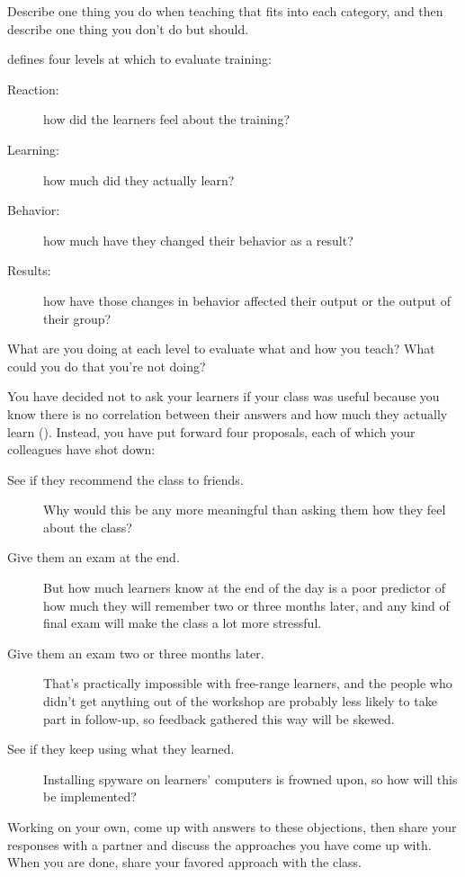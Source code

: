 Describe one thing you do when teaching that fits into each category,
and then describe one thing you don't do but should.


\cite{Kirk1994} defines four levels at which to evaluate training:

\begin{description}

\item[Reaction:]
  how did the learners feel about the training?

\item[Learning:]
  how much did they actually learn?

\item[Behavior:]
  how much have they changed their behavior as a result?

\item[Results:]
  how have those changes in behavior affected their output
  or the output of their group?

\end{description}

What are you doing at each level to evaluate what and how you teach?
What could you do that you're not doing?


You have decided not to ask your learners if your class was useful
because you know there is no correlation between their answers
and how much they actually learn ().
Instead,
you have put forward four proposals,
each of which your colleagues have shot down:

\begin{description}

\item[See if they recommend the class to friends.]
  Why would this be any more meaningful
  than asking them how they feel about the class?

\item[Give them an exam at the end.]
  But how much learners know at the end of the day
  is a poor predictor of how much they will remember two or three months later,
  and any kind of final exam will make the class a lot more stressful.

\item[Give them an exam two or three months later.]
  That's practically impossible with free-range learners,
  and the people who didn't get anything out of the workshop
  are probably less likely to take part in follow-up,
  so feedback gathered this way will be skewed.

\item[See if they keep using what they learned.]
  Installing spyware on learners' computers is frowned upon,
  so how will this be implemented?

\end{description}

Working on your own,
come up with answers to these objections,
then share your responses with a partner
and discuss the approaches you have come up with.
When you are done,
share your favored approach with the class.
